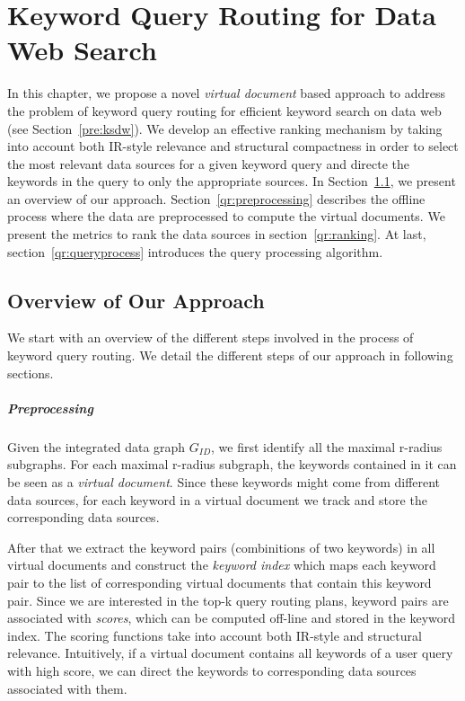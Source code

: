 \chapter{Keyword Query Routing for Data Web Search}\label{qr}

In this chapter, we propose a novel \emph{virtual document} based approach to address the problem of
keyword query routing for efficient keyword search on data web (see Section~\ref{pre:ksdw}). We
develop an effective ranking mechanism by taking into account both IR-style relevance and structural
compactness in order to select the most relevant data sources for a given keyword query and directe
the keywords in the query to only the appropriate sources. In Section~\ref{qr:overview}, we present
an overview of our approach. Section~\ref{qr:preprocessing} describes the offline process where the
data are preprocessed to compute the virtual documents. We present the metrics to rank the data
sources in section~\ref{qr:ranking}. At last, section~\ref{qr:queryprocess} introduces the query
processing algorithm.

\section{Overview of Our Approach}\label{qr:overview}
We start with an overview of the different steps involved in the process of keyword query routing. We
detail the different steps of our approach in following sections.

\paragraph{Preprocessing}
Given the integrated data graph $G_{ID}$, we first identify all the maximal r-radius subgraphs.
For each maximal r-radius subgraph, the keywords contained in it can be seen as a {\em virtual
document}. Since these keywords might come from different data sources, for each keyword in a
virtual document we track and store the corresponding data sources.

After that we extract the keyword pairs (combinitions of two keywords) in all virtual documents and
construct the {\em keyword index} which maps each keyword pair to the list of corresponding virtual
documents that contain this keyword pair. Since we are interested in the top-k query routing
plans, keyword pairs are associated with {\em scores}, which can be computed off-line and stored in the
keyword index. The scoring functions take into account both IR-style and structural relevance.
Intuitively, if a virtual document contains all keywords of a user query with high score, we can
direct the keywords to corresponding data sources associated with them. 

